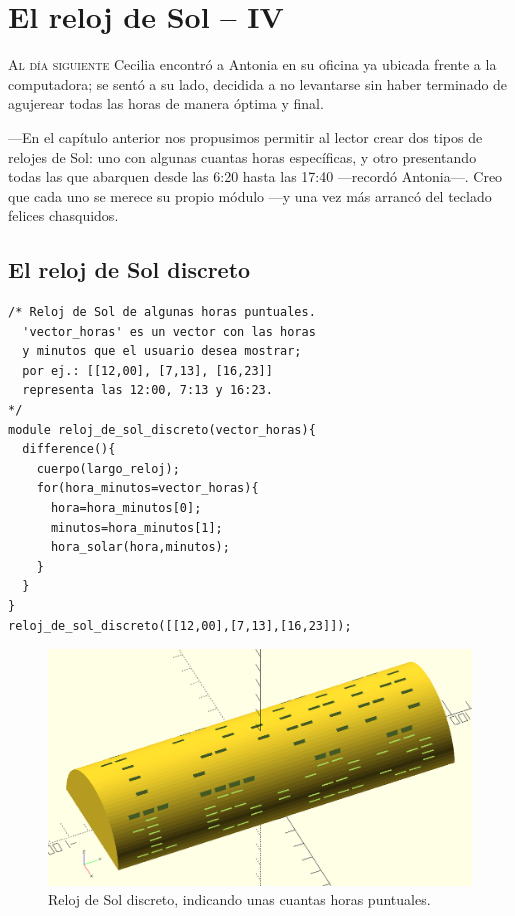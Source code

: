 \chapter{El reloj de Sol -- IV}
\label{sec:el-reloj-de-sol-iv}  

\lettrine[lines=2]{A}{l día siguiente} Cecilia encontró a Antonia en
su oficina ya ubicada frente a la computadora; se sentó a su lado,
decidida a no levantarse sin haber terminado de agujerear todas las
horas de manera óptima y final.

---En el capítulo anterior nos propusimos permitir al lector crear dos
tipos de relojes de Sol: uno con algunas cuantas horas específicas, y
otro presentando todas las que abarquen desde las 6:20 hasta las 17:40
---recordó An\-to\-\mbox{nia---.} Creo que cada uno se merece su propio módulo
---y una vez más arrancó del teclado felices chasquidos.

\section{El reloj de Sol discreto}

\begin{lstlisting}
/* Reloj de Sol de algunas horas puntuales.
  'vector_horas' es un vector con las horas
  y minutos que el usuario desea mostrar;
  por ej.: [[12,00], [7,13], [16,23]]
  representa las 12:00, 7:13 y 16:23.
*/
module reloj_de_sol_discreto(vector_horas){
  difference(){
    cuerpo(largo_reloj);    
    for(hora_minutos=vector_horas){
      hora=hora_minutos[0];
      minutos=hora_minutos[1];
      hora_solar(hora,minutos);    
    }
  }
}
reloj_de_sol_discreto([[12,00],[7,13],[16,23]]);
\end{lstlisting}%

\begin{figure}[ht]
  \centering
  \includegraphics[width=.85\textwidth]{imagenes/reloj-de-sol-discreto}
  \caption{Reloj de Sol discreto, indicando unas cuantas horas
    puntuales.}
  \label{fig:reloj-de-sol-discreto}
\end{figure}

